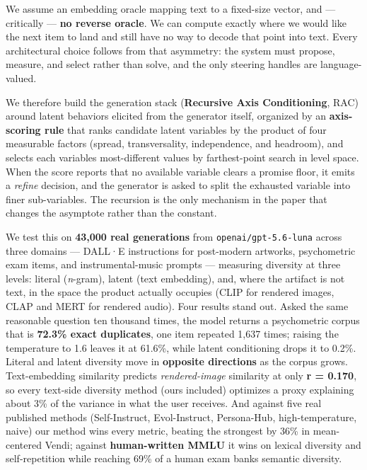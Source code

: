 \documentclass[
  11pt,
]{article}
\theoremstyle{plain}
\theoremstyle{definition}
\begin{document}
We assume an embedding oracle mapping text to a fixed-size vector, and
--- critically --- \textbf{no reverse oracle}. We can compute exactly
where we would like the next item to land and still have no way to
decode that point into text. Every architectural choice follows from
that asymmetry: the system must propose, measure, and select rather than
solve, and the only steering handles are language-valued.

We therefore build the generation stack (\textbf{Recursive Axis
Conditioning}, RAC) around latent behaviors elicited from the generator
itself, organized by an \textbf{axis-scoring rule} that ranks candidate
latent variables by the product of four measurable factors (spread,
transversality, independence, and headroom), and selects each
variable\textquotesingle s most-different values by farthest-point
search in level space. When the score reports that no available variable
clears a promise floor, it emits a \emph{refine} decision, and the
generator is asked to split the exhausted variable into finer
sub-variables. The recursion is the only mechanism in the paper that
changes the asymptote rather than the constant.

We test this on \textbf{43,000 real generations} from
\texttt{openai/gpt-5.6-luna} across three domains --- DALL·E
instructions for post-modern artworks, psychometric exam items, and
instrumental-music prompts --- measuring diversity at three levels:
literal (\emph{n}-gram), latent (text embedding), and, where the
artifact is not text, in the space the product actually occupies (CLIP
for rendered images, CLAP and MERT for rendered audio). Four results
stand out. Asked the same reasonable question ten thousand times, the
model returns a psychometric corpus that is \textbf{72.3\% exact
duplicates}, one item repeated 1,637 times; raising the temperature to
1.6 leaves it at 61.6\%, while latent conditioning drops it to 0.2\%.
Literal and latent diversity move in \textbf{opposite directions} as the
corpus grows. Text-embedding similarity predicts \emph{rendered-image}
similarity at only \textbf{r = 0.170}, so every text-side diversity
method (ours included) optimizes a proxy explaining about 3\% of the
variance in what the user receives. And against five real published
methods (Self-Instruct, Evol-Instruct, Persona-Hub, high-temperature,
naive) our method wins every metric, beating the strongest by 36\% in
mean-centered Vendi; against \textbf{human-written MMLU} it wins on
lexical diversity and self-repetition while reaching 69\% of a human
exam bank\textquotesingle s semantic diversity.
\end{document}
